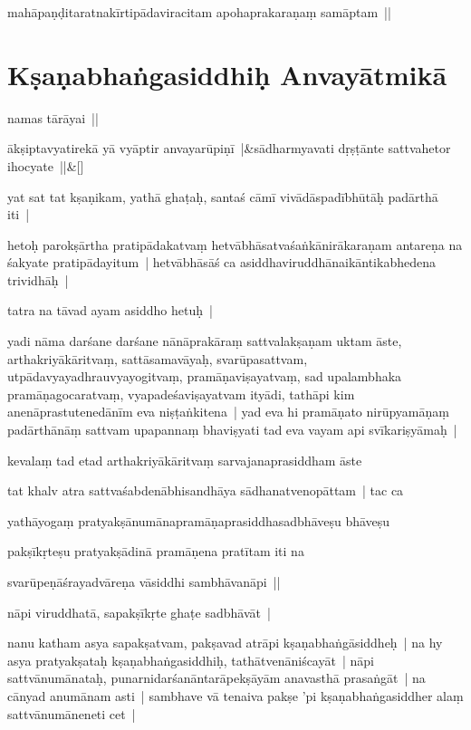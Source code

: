\documentclass[article,12pt,a4paper]{memoir}
\begin{document}
	  \pstart mahāpaṇḍitaratnakīrtipādaviracitam apohaprakaraṇaṃ samāptam || 
	\pend
      
	  
	
\section[{Kṣaṇabhaṅgasiddhiḥ Anvayātmikā}]{Kṣaṇabhaṅgasiddhiḥ Anvayātmikā}\label{Kṣaṇabhaṅgasiddhiḥ_Anvayātmikā}

	  \pstart namas tārāyai ||
	\pend
      
	    
	    \stanza[\smallbreak]
	ākṣiptavyatirekā yā vyāptir anvayarūpiṇī |&sādharmyavati dṛṣṭānte sattvahetor ihocyate ||\&[\smallbreak]


	

	  \pstart yat sat tat kṣaṇikam, yathā ghaṭaḥ, santaś cāmī vivādāspadībhūtāḥ padārthā iti |
	\pend
      

	  \pstart hetoḥ parokṣārtha pratipādakatvaṃ hetvābhāsatvaśaṅkānirākaraṇam antareṇa na śakyate pratipādayitum | hetvābhāsāś ca asiddhaviruddhānaikāntikabhedena trividhāḥ |
	\pend
      

	  \pstart tatra na tāvad ayam asiddho hetuḥ | 
	\pend
      

	  \pstart yadi nāma darśane darśane nānāprakāraṃ sattvalakṣaṇam uktam āste, arthakriyākāritvaṃ, sattāsamavāyaḥ, svarūpasattvam, utpādavyayadhrauvyayogitvaṃ, pramāṇaviṣayatvaṃ, sad upalambhaka pramāṇagocaratvaṃ, vyapadeśaviṣayatvam ityādi, tathāpi kim anenāprastutenedānīm eva niṣṭaṅkitena | yad eva hi pramāṇato nirūpyamāṇaṃ padārthānāṃ sattvam upapannaṃ bhaviṣyati tad eva vayam api svīkariṣyāmaḥ | 
	\pend
      

	  \pstart kevalaṃ tad etad arthakriyākāritvaṃ sarvajanaprasiddham āste
	\pend
      

	  \pstart tat khalv atra sattvaśabdenābhisandhāya sādhanatvenopāttam | tac ca
	\pend
      

	  \pstart yathāyogaṃ pratyakṣānumānapramāṇaprasiddhasadbhāveṣu bhāveṣu
	\pend
      

	  \pstart pakṣīkṛteṣu pratyakṣādinā pramāṇena pratītam iti na
	\pend
      

	  \pstart svarūpeṇāśrayadvāreṇa vāsiddhi sambhāvanāpi ||
	\pend
      

	  \pstart nāpi viruddhatā, sapakṣīkṛte ghaṭe sadbhāvāt |
	\pend
      

	  \pstart nanu katham asya sapakṣatvam, pakṣavad atrāpi kṣaṇabhaṅgāsiddheḥ | na hy asya pratyakṣataḥ kṣaṇabhaṅgasiddhiḥ, tathātvenāniścayāt | nāpi sattvānumānataḥ, punarnidarśanāntarāpekṣāyām anavasthā prasaṅgāt | na cānyad anumānam asti | sambhave vā tenaiva pakṣe 'pi kṣaṇabhaṅgasiddher alaṃ sattvānumāneneti cet |
	\pend
      
\end{document}
